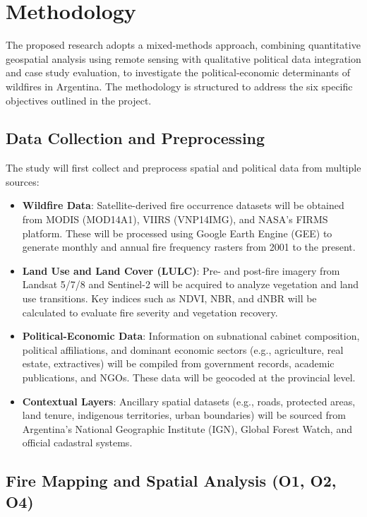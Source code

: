 \section{Methodology}

The proposed research adopts a mixed-methods approach, combining quantitative geospatial analysis using remote sensing with qualitative political data integration and case study evaluation, to investigate the political-economic determinants of wildfires in Argentina. The methodology is structured to address the six specific objectives outlined in the project.

\subsection{Data Collection and Preprocessing}

The study will first collect and preprocess spatial and political data from multiple sources:

\begin{itemize}
    \item \textbf{Wildfire Data}: Satellite-derived fire occurrence datasets will be obtained from MODIS (MOD14A1), VIIRS (VNP14IMG), and NASA’s FIRMS platform. These will be processed using Google Earth Engine (GEE) to generate monthly and annual fire frequency rasters from 2001 to the present.
    \item \textbf{Land Use and Land Cover (LULC)}: Pre- and post-fire imagery from Landsat 5/7/8 and Sentinel-2 will be acquired to analyze vegetation and land use transitions. Key indices such as NDVI, NBR, and dNBR will be calculated to evaluate fire severity and vegetation recovery.
    \item \textbf{Political-Economic Data}: Information on subnational cabinet composition, political affiliations, and dominant economic sectors (e.g., agriculture, real estate, extractives) will be compiled from government records, academic publications, and NGOs. These data will be geocoded at the provincial level.
    \item \textbf{Contextual Layers}: Ancillary spatial datasets (e.g., roads, protected areas, land tenure, indigenous territories, urban boundaries) will be sourced from Argentina’s National Geographic Institute (IGN), Global Forest Watch, and official cadastral systems.
\end{itemize}

\subsection{Fire Mapping and Spatial Analysis (O1, O2, O4)}

